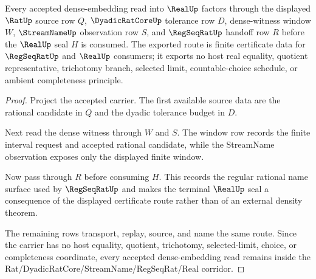 \begin{theorem}
\label{thm:rational-dense-embedding-regseqrat-handoff}
Every accepted dense-embedding read into $\RealUp$ factors through the displayed $\RatUp$ source row $Q$, $\DyadicRatCoreUp$ tolerance row $D$, dense-witness window $W$, $\StreamNameUp$ observation row $S$, and $\RegSeqRatUp$ handoff row $R$ before the $\RealUp$ seal $H$ is consumed. The exported route is finite certificate data for $\RegSeqRatUp$ and $\RealUp$ consumers; it exports no host real equality, quotient representative, trichotomy branch, selected limit, countable-choice schedule, or ambient completeness principle.
\end{theorem}
\begin{proof}
Project the accepted carrier. The first available source data are the rational candidate in $Q$ and the dyadic tolerance budget in $D$.

Next read the dense witness through $W$ and $S$. The window row records the finite interval request and accepted rational candidate, while the StreamName observation exposes only the displayed finite window.

Now pass through $R$ before consuming $H$. This records the regular rational name surface used by $\RegSeqRatUp$ and makes the terminal $\RealUp$ seal a consequence of the displayed certificate route rather than of an external density theorem.

The remaining rows transport, replay, source, and name the same route. Since the carrier has no host equality, quotient, trichotomy, selected-limit, choice, or completeness coordinate, every accepted dense-embedding read remains inside the Rat/DyadicRatCore/StreamName/RegSeqRat/Real corridor.
\end{proof}


\begin{closurestatus}{\RationalDenseEmbeddingUp}
  \theoryclosure{\seedClosure}
  \formalstatus{\unformalizedV}
\end{closurestatus}
